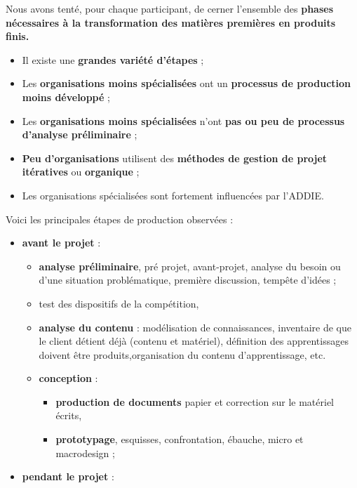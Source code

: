 \begin{frame}[allowframebreaks]
                   			
                        			Nous avons tenté, pour chaque participant, de cerner l’ensemble des \textbf{phases nécessaires à la transformation des matières premières en produits finis.}
						\begin{itemize}
						\framebreak
						\item Il existe une \textbf{grandes variété d'étapes} ;
						\item Les \textbf{organisations moins spécialisées} ont un \textbf{processus de production moins développé} ;
						\item Les \textbf{organisations moins spécialisées} n'ont \textbf{pas ou peu de processus d'analyse préliminaire} ;
						\item \textbf{Peu d'organisations} utilisent des \textbf{méthodes de gestion de projet itératives} ou \textbf{organique };
						\item Les organisations spécialisées sont fortement influencées par l'ADDIE.
						\end{itemize}
						\framebreak
						Voici les principales étapes de production observées :	
						\begin{itemize}
						\item \textbf{avant le projet} : 
							\begin{itemize}
							\item \textbf{analyse préliminaire}, pré projet, avant-projet, analyse du besoin ou d'une situation problématique, première discussion, tempête d’idées ;
							\item test des dispositifs de la compétition, 
							\item \textbf{analyse du contenu} : modélisation de connaissances, inventaire de que le client détient déjà (contenu et matériel), définition des apprentissages doivent être produits,organisation du contenu d’apprentissage, etc.
							\item \textbf{conception} :
								\begin{itemize}
								\item \textbf{production de documents} papier et  correction sur le matériel écrits,
								\item \textbf{prototypage}, esquisses, confrontation, ébauche, micro et macrodesign ;
								\end{itemize}
							\end{itemize}
						\framebreak
						\item \textbf{pendant le projet }:
							\begin{itemize}

\end{itemize}
\end{itemize}
\end{frame}

